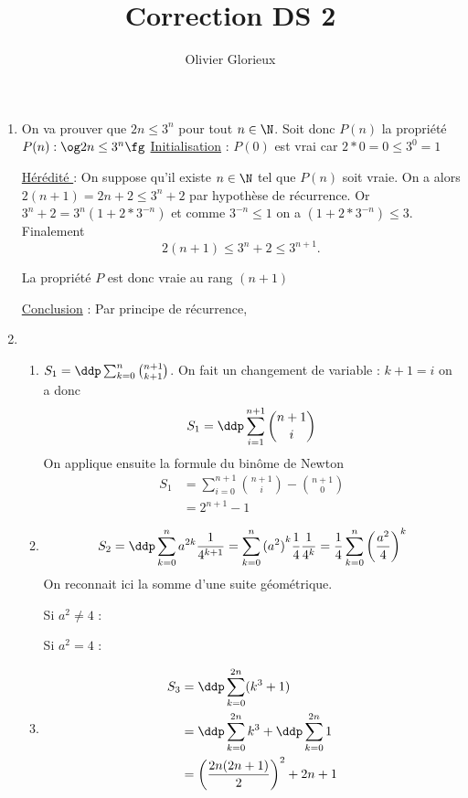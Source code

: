 \documentclass[a4paper, 11pt,reqno]{article}
\author{Olivier Glorieux}
\begin{document}
\title{Correction DS 2
}




\begin{correction}
\begin{enumerate}


\item On va prouver que $2n\leq 3^n$ pour tout $n\in \N$. Soit donc $P(n)$ la propriété 
$P(n) : \og 2n\leq 3^n \fg $
\underline{Initialisation} : $P(0)$  est vrai car $2*0=0\leq 3^0=1$

\underline{Hérédité } : On suppose qu'il existe  $n\in \N$ tel que $P(n)$ soit vraie. On a alors $2(n+1) = 2n +2 \leq 3^n+2$ par hypothèse de récurrence.
Or $3^n+2 = 3^{n}(1+2*3^{-n})$ et comme $3^{-n}\leq 1$ on  a  $(1+2*3^{-n})\leq 3$. Finalement  $$2(n+1)\leq 3^n+2\leq 3^{n+1}.$$

La propriété $P$ est donc vraie au rang $(n+1)$ 

\underline{Conclusion} : Par principe de récurrence, 

\item 
\begin{enumerate}
\item $S_1=\ddp \sum_{k=0}^{n} \binom{n+1}{k+1}$. On fait un changement de variable : $k+1=i$ on a donc
$$S_1= \ddp \sum_{i=1}^{n+1} \binom{n+1}{i}$$
On applique ensuite la formule du binôme de Newton 
\begin{align*}
S_1&=  \sum_{i=0}^{n+1} \binom{n+1}{i}  - \binom{n+1}{0}\\
	&=2^{n+1} -1
\end{align*}

\item $$S_2 =\ddp \sum_{k=0}^{n} a^{2k}\frac{1}{4^{k+1}} =\sum_{k=0}^{n} {(a^{2})}^{k}\frac{1}{4}\frac{1}{4^{k}} =\frac{1}{4}\sum_{k=0}^{n} \left(\frac{a^{2}}{4}\right)^k $$
On reconnait ici la somme d'une suite géométrique.

Si $a^2\neq 4$ : 

Si $a^2=4 $ :


\item 
\begin{align*}
S_3&=\ddp \sum_{k=0}^{2n} (k^3+1) \\
&=\ddp \sum_{k=0}^{2n} k^3+ \ddp \sum_{k=0}^{2n} 1\\
&=\left(\frac{2n(2n+1)}{2}\right)^2 + 2n+1
\end{align*}


\end{enumerate}
\end{enumerate}
\end{correction}
\end{document}
